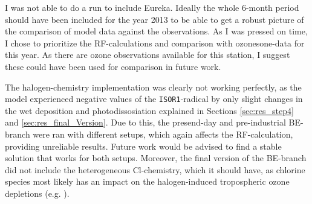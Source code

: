 \medskip
I was not able to do a run to include Eureka. Ideally the whole 6-month period should have been included for the year 2013 to be able to get a robust picture of the comparison of model data against the observations. As I was pressed on time, I chose to prioritize the RF-calculations and comparison with ozonesone-data for this year. As there are ozone observations available for this station, I suggest these could have been used for comparison in future work. 

\medskip

The halogen-chemistry implementation was clearly not working perfectly, as the model experienced negative values of the \texttt{ISOR1}-radical by only slight changes in the wet deposition and photodissosiation explained in Sections \ref{sec:res_step4} and \ref{sec:res_final_Version}. Due to this, the presend-day and pre-industrial BE-branch were ran with different setups, which again affects the RF-calculation, providing unreliable results. Future work would be advised to find a stable solution that works for both setups. Moreover, the final version of the BE-branch did not include the heterogeneous Cl-chemistry, which it should have, as chlorine species most likely has an impact on the halogen-induced tropospheric ozone depletions (e.g. \cite{FinlaysonPitts2010}).